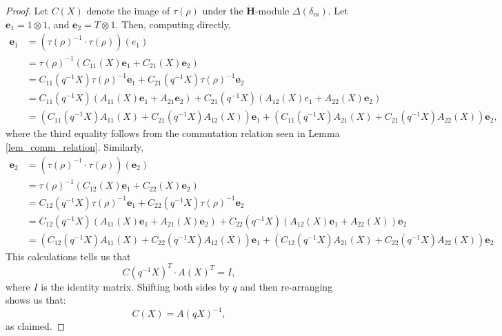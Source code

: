\documentclass[a4paper]{report}
\theoremstyle{theorem}
\theoremstyle{definition}
\theoremstyle{remark}
\theoremstyle{proposition}
\theoremstyle{conjecture}
\theoremstyle{lemma}
\theoremstyle{corollary}
\theoremstyle{exercise}
\theoremstyle{example}
\begin{document}
  \begin{proof}
      Let $C(X)$ denote the image of $\tau(\rho)$ under the $\mathbf{\ddot{\mathbf{H}}}$-module 
      $\Delta(\delta_m)$. Let $\mathbf{e}_1 = 1\otimes 1$, and $\mathbf{e}_2 = T\otimes 1$.
      Then, computing directly,
      \begin{align*}
          \mathbf{e}_1 &= \left(\tau(\rho)^{-1} \cdot \tau(\rho)\right) (e_1)\\ 
          &= \tau(\rho)^{-1} \left(C_{11}(X) \mathbf{e}_1 + C_{21}(X) \mathbf{e}_2\right)\\
          &= C_{11}(q^{-1}X) \tau(\rho)^{-1} \mathbf{e}_1 + C_{21}(q^{-1}X) \tau(\rho)^{-1} \mathbf{e}_2\\ 
          &= C_{11}(q^{-1}X) \left(A_{11}(X) \mathbf{e}_1 + A_{21}\mathbf{e}_2\right) + C_{21}(q^{-1}X) \left(A_{12}(X) e_1 + A_{22}(X) \mathbf{e}_2\right)\\
          &= \left(C_{11}(q^{-1}X)A_{11}(X) + C_{21}(q^{-1}X) A_{12}(X)\right)\mathbf{e}_1 + \left(C_{11}(q^{-1}X) A_{21}(X) + C_{21}(q^{-1}X) A_{22}(X)\right)\mathbf{e}_2,
      \end{align*}
      where the third equality follows from the commutation relation seen in 
      Lemma \ref{lem_comm_relation}.
      Similarly,
      \begin{align*}
          \mathbf{e}_2 &= \left(\tau(\rho)^{-1} \cdot \tau(\rho)\right)(\mathbf{e}_2) \\
          &= \tau(\rho)^{-1} \left(C_{12}(X) \mathbf{e}_1 + C_{22}(X) \mathbf{e}_2\right)\\ 
          &= C_{12}(q^{-1}X) \tau(\rho)^{-1} \mathbf{e}_1 + C_{22}(q^{-1}X) \tau(\rho)^{-1}\mathbf{e}_2\\
          &= C_{12}(q^{-1}X) \left(A_{11}(X) \mathbf{e}_1 + A_{21}(X) \mathbf{e}_2\right) + C_{22}(q^{-1}X) \left(A_{12}(X) \mathbf{e}_1 + A_{22}(X)\right) \mathbf{e}_2\\ 
          &= \left(C_{12}(q^{-1}X) A_{11}(X) + C_{22}(q^{-1}X) A_{12}(X) \right)\mathbf{e}_1 + \left(C_{12}(q^{-1}X) A_{21}(X) + C_{22}(q^{-1}X) A_{22}(X)\right)\mathbf{e}_2
      \end{align*}
      This calculations tells us that $$C(q^{-1}X)^T \cdot A(X)^T = I,$$
      where $I$ is the identity matrix. Shifting both sides by $q$ and then re-arranging shows 
      us that: 
      $$C(X) = A(qX)^{-1},$$
      as claimed.
  \end{proof}
  
\end{document}
